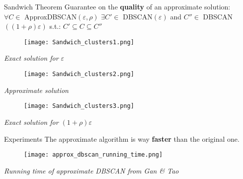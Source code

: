 \documentclass[aspectratio=169]{beamer}
\renewcommand{\epsilon}{\varepsilon}
\begin{document}
\begin{frame}{Sandwich Theorem}
    Guarantee on the \textbf{quality} of an approximate solution:\\
    $\forall C\in$ ApproxDBSCAN$(\epsilon,\rho)$ $\exists C'\in$ DBSCAN$(\epsilon)$ and $C''\in$ DBSCAN$((1+\rho)\epsilon)$ s.t.: $C'\subseteq C\subseteq C''$
        \vspace{0.5cm}
    
    \begin{minipage}{0.3\textwidth}
        \begin{figure}
            \centering
            \texttt{[image: Sandwich\_clusters1.png]}
        \end{figure}
        \begin{center}
            \small \textit{Exact solution for $\epsilon$}
        \end{center}
    \end{minipage}
    \begin{minipage}{0.3\textwidth}
        \begin{figure}
            \centering
            \texttt{[image: Sandwich\_clusters2.png]}
        \end{figure}
        \begin{center}
            \small \textit{Approximate solution}
        \end{center}
    \end{minipage}
    \begin{minipage}{0.3\textwidth}
        \begin{figure}
            \centering
            \texttt{[image: Sandwich\_clusters3.png]}
        \end{figure}

        \begin{center}
            \small \textit{Exact solution for $(1+\rho)\epsilon$}
        \end{center}
    \end{minipage}
    
\end{frame}

\begin{frame}{Experiments}
    The approximate algorithm is way \textbf{faster} than the original one.

    \vspace{0.5cm}

    \begin{figure}
    \centering
    \texttt{[image: approx\_dbscan\_running\_time.png]}
\end{figure}
\begin{center}
\textit{Running time of approximate DBSCAN from Gan \& Tao}
\end{center}
\end{frame}
\end{document}
